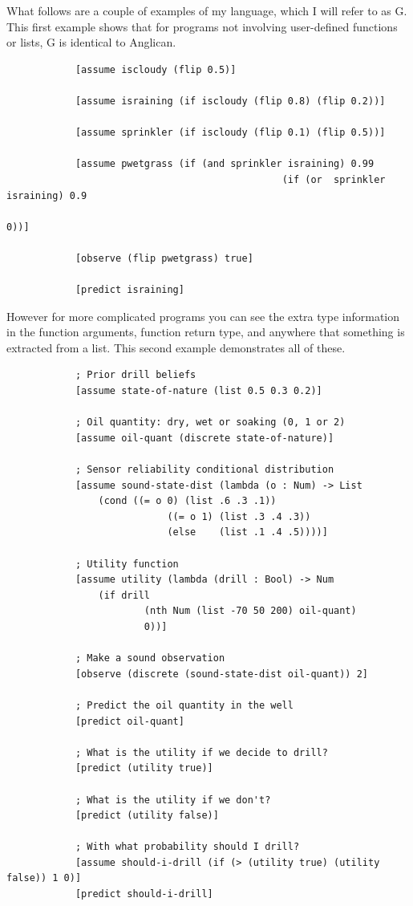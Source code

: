 \documentclass[a4paper]{article}
\begin{document}
What follows are a couple of examples of my language, which I will refer to as G. This first example shows that for programs not involving user-defined functions or lists, G is identical to Anglican.
\begin{center}
	\begin{varwidth}{\linewidth}
		\small
		\begin{verbatim}
			[assume iscloudy (flip 0.5)]
			
			[assume israining (if iscloudy (flip 0.8) (flip 0.2))]
			
			[assume sprinkler (if iscloudy (flip 0.1) (flip 0.5))]
			
			[assume pwetgrass (if (and sprinkler israining) 0.99
												(if (or  sprinkler israining) 0.9
																											0))]
			
			[observe (flip pwetgrass) true]
			
			[predict israining]
		\end{verbatim}
	\end{varwidth}
\end{center}
However for more complicated programs you can see the extra type information in the function arguments, function return type, and anywhere that something is extracted from a list. This second example demonstrates all of these.
\begin{center}
	\begin{varwidth}{\linewidth}
		\small
		\begin{verbatim}
			; Prior drill beliefs
			[assume state-of-nature (list 0.5 0.3 0.2)] 

			; Oil quantity: dry, wet or soaking (0, 1 or 2)
			[assume oil-quant (discrete state-of-nature)]

			; Sensor reliability conditional distribution
			[assume sound-state-dist (lambda (o : Num) -> List
				(cond ((= o 0) (list .6 .3 .1))
							((= o 1) (list .3 .4 .3))
							(else    (list .1 .4 .5))))]

			; Utility function 
			[assume utility (lambda (drill : Bool) -> Num 
				(if drill
						(nth Num (list -70 50 200) oil-quant)
						0))]

			; Make a sound observation
			[observe (discrete (sound-state-dist oil-quant)) 2]

			; Predict the oil quantity in the well
			[predict oil-quant]

			; What is the utility if we decide to drill?
			[predict (utility true)]

			; What is the utility if we don't?
			[predict (utility false)]

			; With what probability should I drill?
			[assume should-i-drill (if (> (utility true) (utility false)) 1 0)]
			[predict should-i-drill]
		\end{verbatim}
	\end{varwidth}
\end{center}
\end{document}
